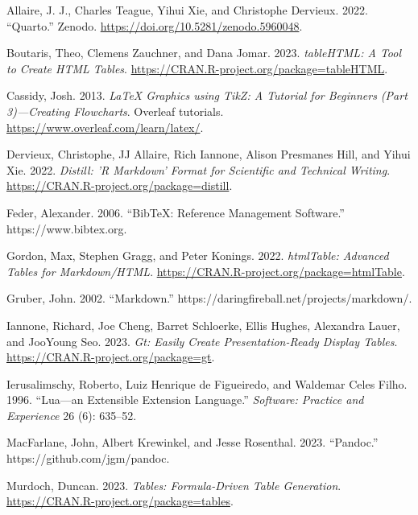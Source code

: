 \hypertarget{refs}{}
\begin{CSLReferences}{1}{0}
\leavevmode{}%
Allaire, J. J., Charles Teague, Yihui Xie, and Christophe Dervieux. 2022. {``Quarto.''} Zenodo. \url{https://doi.org/10.5281/zenodo.5960048}.

\leavevmode{}%
Boutaris, Theo, Clemens Zauchner, and Dana Jomar. 2023. \emph{tableHTML: A Tool to Create HTML Tables}. \url{https://CRAN.R-project.org/package=tableHTML}.

\leavevmode{}%
Cassidy, Josh. 2013. \emph{{LaTeX Graphics using TikZ: A Tutorial for Beginners (Part 3)---Creating Flowcharts}}. Overleaf tutorials. \url{https://www.overleaf.com/learn/latex/}.

\leavevmode{}%
Dervieux, Christophe, JJ Allaire, Rich Iannone, Alison Presmanes Hill, and Yihui Xie. 2022. \emph{Distill: 'R Markdown' Format for Scientific and Technical Writing}. \url{https://CRAN.R-project.org/package=distill}.

\leavevmode{}%
Feder, Alexander. 2006. {``BibTeX: Reference Management Software.''} https://www.bibtex.org.

\leavevmode{}%
Gordon, Max, Stephen Gragg, and Peter Konings. 2022. \emph{htmlTable: Advanced Tables for Markdown/HTML}. \url{https://CRAN.R-project.org/package=htmlTable}.

\leavevmode{}%
Gruber, John. 2002. {``Markdown.''} https://daringfireball.net/projects/markdown/.

\leavevmode{}%
Iannone, Richard, Joe Cheng, Barret Schloerke, Ellis Hughes, Alexandra Lauer, and JooYoung Seo. 2023. \emph{Gt: Easily Create Presentation-Ready Display Tables}. \url{https://CRAN.R-project.org/package=gt}.

\leavevmode{}%
Ierusalimschy, Roberto, Luiz Henrique de Figueiredo, and Waldemar Celes Filho. 1996. {``Lua---an Extensible Extension Language.''} \emph{Software: Practice and Experience} 26 (6): 635--52.

\leavevmode{}%
MacFarlane, John, Albert Krewinkel, and Jesse Rosenthal. 2023. {``Pandoc.''} https://github.com/jgm/pandoc.

\leavevmode{}%
Murdoch, Duncan. 2023. \emph{Tables: Formula-Driven Table Generation}. \url{https://CRAN.R-project.org/package=tables}.


\end{CSLReferences}
